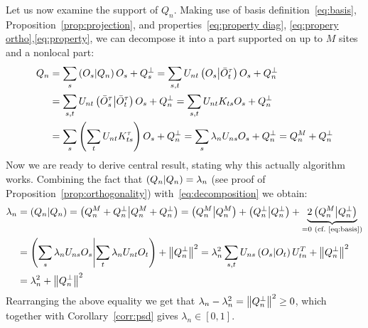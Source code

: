 Let us now examine the support of \(Q_n\). Making use of basis definition~\eqref{eq:basis},
Proposition~\ref{prop:projection}, and properties~\eqref{eq:property diag},
\eqref{eq:propery ortho},\eqref{eq:property}, we can decompose it into a part supported
on up to \(M\) sites and a nonlocal part:
\begin{align}
  Q_n &=  \sum_s \left(O_s \middle| Q_n\right)O_s + Q_s^{\perp} = \sum_{s,t} U_{n t}\left(O_{s} \middle| \bar{O}_{t}^{\tau}\right)
  O_{s}+Q_{n}^{\perp} \nonumber \\
  &= \sum_{s,t} U_{n t}\left(\bar{O}_{s}^{\tau} \middle| \bar{O}_{t}^{\tau}\right) O_{s}+Q_{n}^{\perp}
  = \sum_{s,t} U_{n t}K_{ts} O_{s}+Q_{n}^{\perp} \nonumber \\
  &= \sum_s  \left( \sum_t U_{n t}K_{ts}^{\tau}\right) O_{s}+Q_{n}^{\perp} = \sum_{s} 
  \lambda_{n} U_{n s} O_{s}+Q_{n}^{\perp} = Q_{n}^{M}+Q_{n}^{\perp}
  \label{eq:decomposition}
\end{align}
Now we are ready to derive central result, stating why this actually algorithm works. 
Combining the fact that \(\left(Q_n \middle| Q_n\right) = \lambda_n \) (see proof of 
Proposition~\ref{prop:orthogonality}) with~\eqref{eq:decomposition} we obtain:
\begin{align}
  \lambda_n &= \left(Q_n \middle| Q_n\right) = \left(Q_n^M + Q_n^{\perp} \middle| Q_n^M + Q_n^{\perp}\right) = \left(Q_n^M \middle| Q_n^M\right) +
   \left(Q_n^{\perp} \middle| Q_n^{\perp}\right) + \underbrace{2 \left(Q_n^M \middle| Q_n^{\perp}\right)}_{=0 \text{ (cf.~\eqref{eq:basis})}} \nonumber \\
   &= \left(\sum_s \lambda_n U_{ns} O_s \middle| \sum_t \lambda_n U_{nt} O_t\right) + \norm{Q_n^{\perp}}^2 =
  \lambda_n^2 \sum_{s,t} U_{ns} \left(O_s \middle| O_t\right) U_{tn}^{T} + \norm{Q_n^{\perp}}^2  \nonumber \\
  &=\lambda_n^2 + \norm{Q_n^{\perp}}^2
\end{align}
Rearranging the above equality we get that \(\lambda_n - \lambda_n^2 = \norm{Q_n^{\perp}}^2 \geq 0\), which together with
Corollary~\ref{corr:psd} gives \(\lambda_n \in \left[0,1\right]\). 

